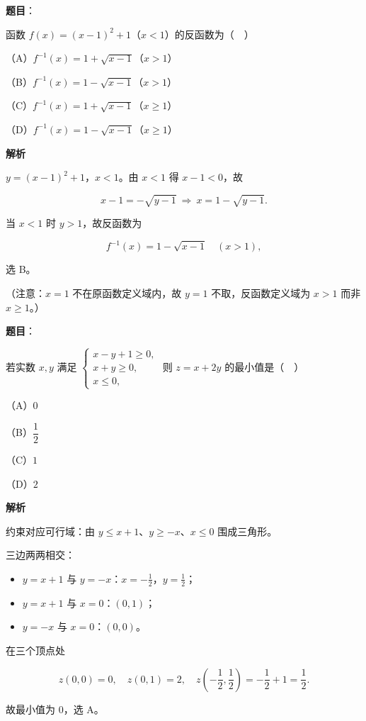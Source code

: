 \begin{answer}

\textbf{题目}：

函数 $f(x)=(x-1)^2+1$（$x<1$）的反函数为（　）

（A）$f^{-1}(x)=1+\sqrt{x-1}$（$x>1$）

（B）$f^{-1}(x)=1-\sqrt{x-1}$（$x>1$）

（C）$f^{-1}(x)=1+\sqrt{x-1}$（$x\geqslant1$）

（D）$f^{-1}(x)=1-\sqrt{x-1}$（$x\geqslant1$）

\textbf{解析}

$y=(x-1)^2+1$，$x<1$。由 $x<1$ 得 $x-1<0$，故

\nopagebreak[4]
\[x-1=-\sqrt{y-1}\ \Longrightarrow\ x=1-\sqrt{y-1}.\]

当 $x<1$ 时 $y>1$，故反函数为

\nopagebreak[4]
\[f^{-1}(x)=1-\sqrt{x-1}\quad(x>1),\]

选 B。

（注意：$x=1$ 不在原函数定义域内，故 $y=1$ 不取，反函数定义域为 $x>1$ 而非 $x\geqslant1$。）


\end{answer}
\begin{answer}

\textbf{题目}：

若实数 $x,y$ 满足 $\begin{cases}x-y+1\geqslant0,\\ x+y\geqslant0,\\ x\leqslant0,\end{cases}$ 则 $z=x+2y$ 的最小值是（　）

（A）$0$

（B）$\dfrac12$

（C）$1$

（D）$2$

\textbf{解析}

约束对应可行域：由 $y\leqslant x+1$、$y\geqslant -x$、$x\leqslant0$ 围成三角形。

三边两两相交：

\begin{itemize}
\item $y=x+1$ 与 $y=-x$：$x=-\frac12$，$y=\frac12$；
\item $y=x+1$ 与 $x=0$：$(0,1)$；
\item $y=-x$ 与 $x=0$：$(0,0)$。
\end{itemize}

在三个顶点处

\nopagebreak[4]
\[z(0,0)=0,\quad z(0,1)=2,\quad z\left(-\frac12,\frac12\right)=-\frac12+1=\frac12 .\]

故最小值为 $0$，选 A。


\end{answer}
